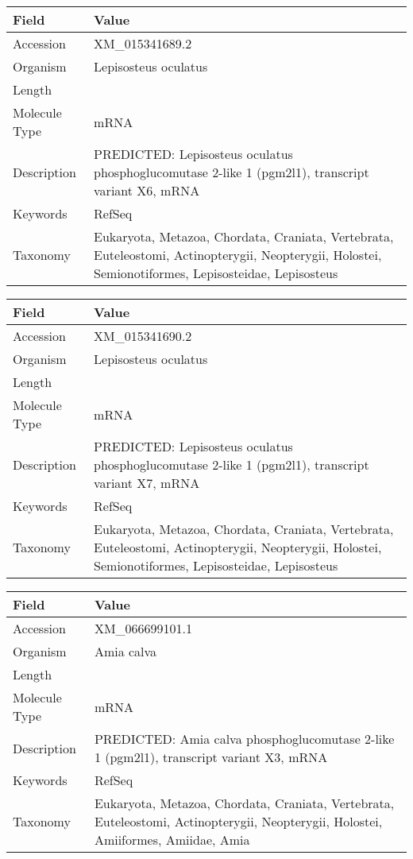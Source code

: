 \documentclass[10pt]{article}
\begin{document}
\vspace{1em}
{\footnotesize
\begin{longtable}{>{\raggedright\arraybackslash}p{4.5cm} >{\raggedright\arraybackslash}p{11.5cm}}
\textbf{Field} & \textbf{Value} \\
\hline
Accession & XM\_015341689.2 \\
Organism & Lepisosteus oculatus \\
Length & 6873 \\
Molecule Type & mRNA \\
Description & PREDICTED: Lepisosteus oculatus phosphoglucomutase 2-like 1 (pgm2l1), transcript variant X6, mRNA \\
Keywords & RefSeq \\
Taxonomy & Eukaryota, Metazoa, Chordata, Craniata, Vertebrata, Euteleostomi, Actinopterygii, Neopterygii, Holostei, Semionotiformes, Lepisosteidae, Lepisosteus \\
\end{longtable}
}

\vspace{1em}
{\footnotesize
\begin{longtable}{>{\raggedright\arraybackslash}p{4.5cm} >{\raggedright\arraybackslash}p{11.5cm}}
\textbf{Field} & \textbf{Value} \\
\hline
Accession & XM\_015341690.2 \\
Organism & Lepisosteus oculatus \\
Length & 6904 \\
Molecule Type & mRNA \\
Description & PREDICTED: Lepisosteus oculatus phosphoglucomutase 2-like 1 (pgm2l1), transcript variant X7, mRNA \\
Keywords & RefSeq \\
Taxonomy & Eukaryota, Metazoa, Chordata, Craniata, Vertebrata, Euteleostomi, Actinopterygii, Neopterygii, Holostei, Semionotiformes, Lepisosteidae, Lepisosteus \\
\end{longtable}
}

\vspace{1em}
{\footnotesize
\begin{longtable}{>{\raggedright\arraybackslash}p{4.5cm} >{\raggedright\arraybackslash}p{11.5cm}}
\textbf{Field} & \textbf{Value} \\
\hline
Accession & XM\_066699101.1 \\
Organism & Amia calva \\
Length & 7155 \\
Molecule Type & mRNA \\
Description & PREDICTED: Amia calva phosphoglucomutase 2-like 1 (pgm2l1), transcript variant X3, mRNA \\
Keywords & RefSeq \\
Taxonomy & Eukaryota, Metazoa, Chordata, Craniata, Vertebrata, Euteleostomi, Actinopterygii, Neopterygii, Holostei, Amiiformes, Amiidae, Amia \\
\end{longtable}
}
\end{document}
